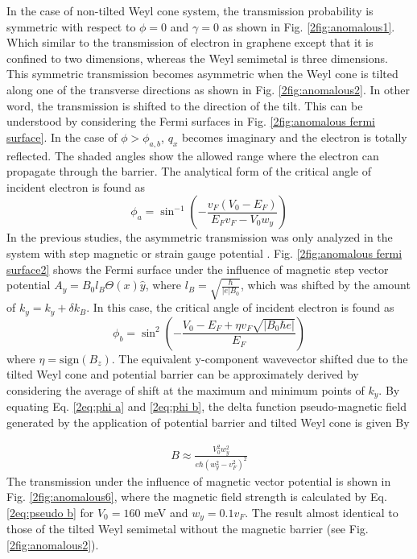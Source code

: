     In the case of non-tilted Weyl cone system, the transmission probability is symmetric with respect to $\phi = 0$ and $\gamma = 0$ as shown in Fig. \ref{2fig:anomalous1}.
    Which similar to the transmission of electron in graphene except that it is confined to two dimensions, whereas the Weyl semimetal is three dimensions.
    This symmetric transmission becomes asymmetric when the Weyl cone is tilted along one of the transverse directions as shown in Fig. \ref{2fig:anomalous2}.
    In other word, the transmission is shifted to the direction of the tilt. 
    This can be understood by considering the Fermi surfaces in Fig. \ref{2fig:anomalous fermi surface}.
    In the case of $\phi > \phi_{a,b}$, $q_x$ becomes imaginary and the electron is totally reflected.
    The shaded angles show the allowed range where the electron can propagate through the barrier.
    The analytical form of the critical angle of incident electron is found as
    \begin{equation} \label{2eq:phi a}
        \phi_a = \sin^{-1}{\left(- \frac{v_F (V_0 - E_F)}{E_F v_F - V_0 w_y}\right)}
    \end{equation}
    In the previous studies, the asymmetric transmission was only analyzed in the system with step magnetic or strain gauge potential \cite{Pereira2009,Fujita2010,Wu2010}.
    Fig. \ref{2fig:anomalous fermi surface2} shows the Fermi surface under the influence of magnetic step vector potential $A_y = B_0 l_B \Theta (x)\hat{y}$, where $l_B = \sqrt{\frac{\hbar}{|e|B_0}}$, 
    which was shifted by the amount of $k_y = k_y + \delta k_B$.
    In this case, the critical angle of incident electron is found as
    \begin{equation} \label{2eq:phi b}
        \phi_b = \sin^2{\left(-\frac{V_0 - E_F + \eta v_F \sqrt{|B_0 \hbar e|}}{E_F}\right)}
    \end{equation}
    where $\eta = \mathrm{sign}(B_z)$. The equivalent y-component wavevector shifted due to the tilted Weyl cone and potential barrier can be approximately derived by considering the average of shift
    at the maximum and minimum points of $k_y$.
    By equating Eq. \ref{2eq:phi a} and \ref{2eq:phi b}, the delta function pseudo-magnetic field generated by the application of potential barrier and tilted Weyl cone is given By


    \begin{align} \label{2eq:pseudo b}
        B \approx \frac{V_0^2 w_y^2}{e \hbar (w_y^2-v_F^2)^2}
    \end{align}
    The transmission under the influence of magnetic vector potential is shown in Fig. \ref{2fig:anomalous6}, where the magnetic field strength is calculated by Eq. \ref{2eq:pseudo b} for $V_0 = 160$ meV and $w_y = 0.1 v_F$.
    The result almost identical to those of the tilted Weyl semimetal without the magnetic barrier (see Fig. \ref{2fig:anomalous2}).


